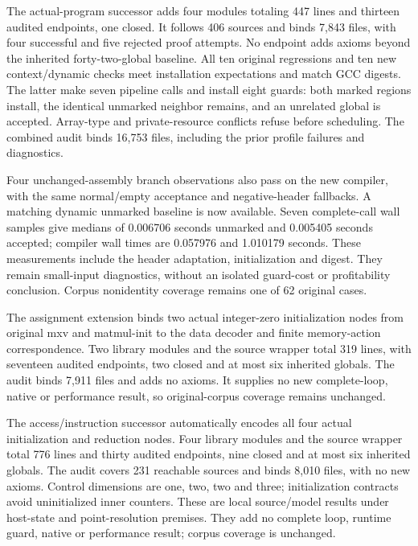 The actual-program successor adds four modules totaling 447 lines and
thirteen audited endpoints, one closed. It follows 406 sources and binds
7,843 files, with four successful and five rejected proof attempts. No endpoint
adds axioms beyond the inherited forty-two-global baseline. All ten original
regressions and ten new context/dynamic checks meet installation expectations
and match GCC digests. The latter make seven pipeline calls and install eight
guards: both marked regions install, the identical unmarked neighbor remains,
and an unrelated global is accepted. Array-type and private-resource conflicts
refuse before scheduling. The combined audit binds 16,753 files, including the
prior profile failures and diagnostics.

Four unchanged-assembly branch observations also pass on the new compiler,
with the same normal/empty acceptance and negative-header fallbacks. A matching
dynamic unmarked baseline is now available. Seven complete-call wall samples
give medians of 0.006706 seconds unmarked and 0.005405 seconds accepted; compiler
wall times are 0.057976 and 1.010179 seconds. These measurements include the
header adaptation, initialization and digest. They remain small-input diagnostics,
without an isolated guard-cost or profitability conclusion. Corpus nonidentity
coverage remains one of 62 original cases.

The assignment extension binds two actual integer-zero initialization nodes
from original mxv and matmul-init to the data decoder and finite memory-action
correspondence. Two library modules and the source wrapper total 319 lines,
with seventeen audited endpoints, two closed and at most six inherited globals.
The audit binds 7,911 files and adds no axioms. It supplies no new complete-loop,
native or performance result, so original-corpus coverage remains unchanged.

The access/instruction successor automatically encodes all four actual
initialization and reduction nodes. Four library modules and the source wrapper
total 776 lines and thirty audited endpoints, nine closed and at most six
inherited globals. The audit covers 231 reachable sources and binds 8,010 files,
with no new axioms. Control dimensions are one, two, two and three; initialization
contracts avoid uninitialized inner counters. These are local source/model
results under host-state and point-resolution premises. They add no complete
loop, runtime guard, native or performance result; corpus coverage is unchanged.

